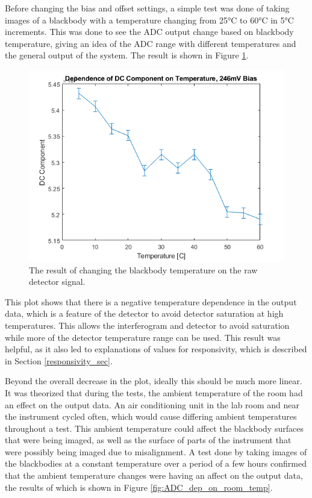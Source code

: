 Before changing the bias and offset settings, a simple test was done of taking images of a blackbody with a temperature changing from 25°C to 60°C in 5°C increments. This was done to see the ADC output change based on blackbody temperature, giving an idea of the ADC range with different temperatures and the general output of the system. The result is shown in Figure \ref{fig:ADC_dep_on_bb_temp}.

\begin{figure}[h]
  \centering
  \includegraphics[width=0.8\linewidth]{chap5_images/DC_dep_on_temp.png}
  \caption{The result of changing the blackbody temperature on the raw detector signal.}
  \label{fig:ADC_dep_on_bb_temp}
\end{figure}

This plot shows that there is a negative temperature dependence in the output data, which is a feature of the detector to avoid detector saturation at high temperatures. This allows the interferogram and detector to avoid saturation while more of the detector temperature range can be used. This result was helpful, as it also led to explanations of values for responsivity, which is described in Section \ref{responsivity_sec}.

Beyond the overall decrease in the plot, ideally this should be much more linear. It was theorized that during the tests, the ambient temperature of the room had an effect on the output data. An air conditioning unit in the lab room and near the instrument cycled often, which would cause differing ambient temperatures throughout a test. This ambient temperature could affect the blackbody surfaces that were being imaged, as well as the surface of parts of the instrument that were possibly being imaged due to misalignment. A test done by taking images of the blackbodies at a constant temperature over a period of a few hours confirmed that the ambient temperature changes were having an affect on the output data, the results of which is shown in Figure \ref{fig:ADC_dep_on_room_temp}.

